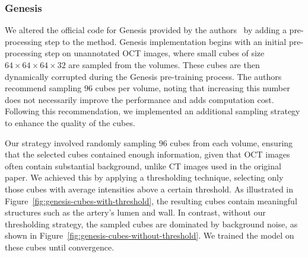 \documentclass[a4paper,11pt,oneside]{report}
\begin{document}
\subsubsection{Genesis}
We altered the official code for Genesis provided by the authors~\cite{Zhou2021} by adding a pre-processing step to the method. Genesis implementation begins with an initial pre-processing step on unannotated OCT images, where small cubes of size $64\times 64\times 64\times 32$ are sampled from the volumes. These cubes are then dynamically corrupted during the Genesis pre-training process. The authors recommend sampling $96$ cubes per volume, noting that increasing this number does not necessarily improve the performance and adds computation cost. Following this recommendation, we implemented an additional sampling strategy to enhance the quality of the cubes.

Our strategy involved randomly sampling $96$ cubes from each volume, ensuring that the selected cubes contained enough information, given that OCT images often contain substantial background, unlike CT images used in the original paper. We achieved this by applying a thresholding technique, selecting only those cubes with average intensities above a certain threshold. As illustrated in Figure~\ref{fig:genesis-cubes-with-threshold}, the resulting cubes contain meaningful structures such as the artery's lumen and wall. In contrast, without our thresholding strategy, the sampled cubes are dominated by background noise, as shown in Figure~\ref{fig:genesis-cubes-without-threshold}. We trained the model on these cubes until convergence.
\end{document}
